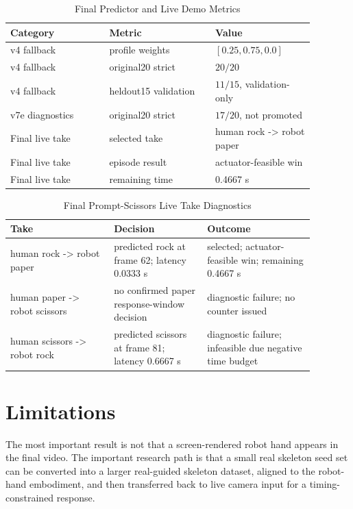 \documentclass[conference]{IEEEtran}
\begin{document}
\begin{table}[t]
\caption{Final Predictor and Live Demo Metrics}
\label{tab:demo}
\centering
\scriptsize
\begin{tabular}{p{0.29\linewidth}p{0.30\linewidth}p{0.29\linewidth}}
\hline
Category & Metric & Value \\
\hline
v4 fallback & profile weights & $[0.25,0.75,0.0]$ \\
v4 fallback & original20 strict & $20/20$ \\
v4 fallback & heldout15 validation & $11/15$, validation-only \\
v7e diagnostics & original20 strict & $17/20$, not promoted \\
Final live take & selected take & human rock -> robot paper \\
Final live take & episode result & actuator-feasible win \\
Final live take & remaining time & 0.4667 s \\
\hline
\end{tabular}
\end{table}

\begin{table}[t]
\caption{Final Prompt-Scissors Live Take Diagnostics}
\label{tab:takes}
\centering
\scriptsize
\begin{tabular}{p{0.30\linewidth}p{0.27\linewidth}p{0.31\linewidth}}
\hline
Take & Decision & Outcome \\
\hline
human rock -> robot paper & predicted rock at frame 62; latency 0.0333 s & selected; actuator-feasible win; remaining 0.4667 s \\
human paper -> robot scissors & no confirmed paper response-window decision & diagnostic failure; no counter issued \\
human scissors -> robot rock & predicted scissors at frame 81; latency 0.6667 s & diagnostic failure; infeasible due negative time budget \\
\hline
\end{tabular}
\end{table}

\section{Limitations}

The most important result is not that a screen-rendered robot hand appears in the final video. The important research path is that a small real skeleton seed set can be converted into a larger real-guided skeleton dataset, aligned to the robot-hand embodiment, and then transferred back to live camera input for a timing-constrained response.
\end{document}
